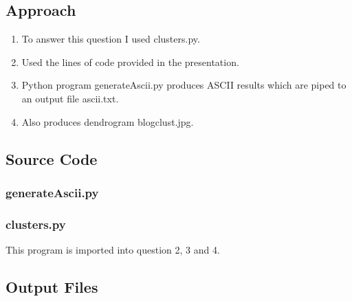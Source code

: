 \documentclass[12pt]{article}
\begin{document}
\subsection{Approach}
\begin{enumerate}
    \item To answer this question I used clusters.py.
    \item Used the lines of code provided in the presentation.
	\item Python program generateAscii.py produces ASCII results which are piped to an output file ascii.txt.
	\item Also produces dendrogram blogclust.jpg.
\end{enumerate}

\newpage
\subsection{Source Code}
\subsubsection{generateAscii.py}

\subsubsection{clusters.py}
This program is imported into question 2, 3 and 4.

\newpage

\subsection{Output Files}
\end{document}
